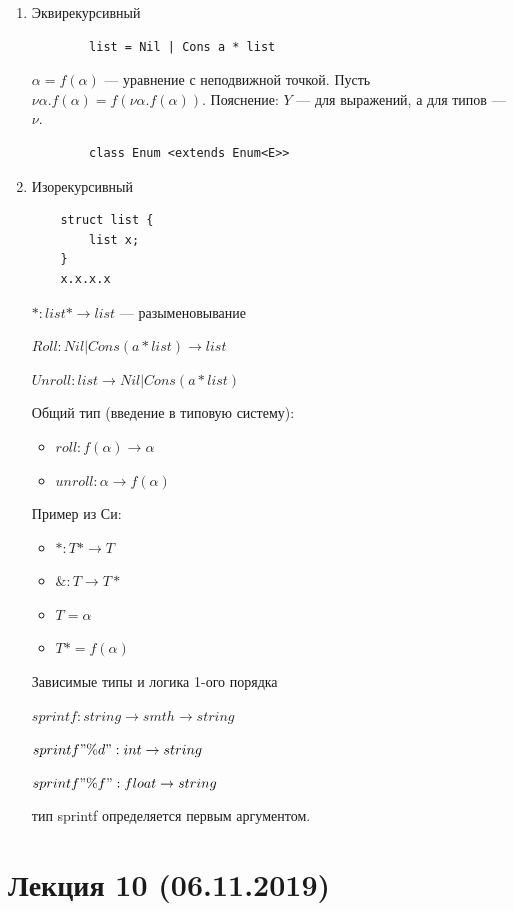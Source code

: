 \documentclass[12pt]{article}
\begin{document}
\begin{enumerate}
    \item Эквирекурсивный 
    \begin{verbatim}
        list = Nil | Cons a * list
    \end{verbatim}
    $\alpha = f(\alpha)$ --- уравнение с неподвижной точкой. Пусть $\nu \alpha. f(\alpha) = f(\nu \alpha.f(\alpha))$. Пояснение: $Y$ --- для выражений, а для типов --- $\nu$.
    \begin{verbatim}
        class Enum <extends Enum<E>>
    \end{verbatim}
    \item Изорекурсивный
    \begin{verbatim}
    struct list {
        list x;
    }
    x.x.x.x
    \end{verbatim}
    $*: list* \rightarrow list$ --- разыменовывание 
    
    $Roll: Nil | Cons (a * list) \rightarrow list$
    
    $Unroll: list \rightarrow Nil | Cons (a * list)$

    Общий тип (введение в типовую систему): 
    \begin{itemize}
        \item $roll: f(\alpha) \rightarrow \alpha$
        \item $unroll: \alpha \rightarrow f(\alpha)$
    \end{itemize}
    
    Пример из Си:
    \begin{itemize}
        \item $*: T* \rightarrow T$
        \item $\&: T \rightarrow T*$
        \item $T = \alpha$
        \item $T* = f(\alpha)$
    \end{itemize}
    
    Зависимые типы и логика 1-ого порядка
    
    $sprintf : string \rightarrow smth \rightarrow string$
    
    $sprintf "\%d" : int \rightarrow string$
    
    $sprintf "\%f" : float \rightarrow string$
    
    тип sprintf определяется первым аргументом.
\end{enumerate}


\section{Лекция 10 (06.11.2019)}
\end{document}
